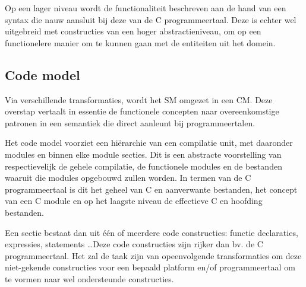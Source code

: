 Op een lager niveau wordt de functionaliteit beschreven aan de hand van een
syntax die nauw aansluit bij deze van de C programmeertaal. Deze is echter wel
uitgebreid met constructies van een hoger abstractieniveau, om op een
functionelere manier om te kunnen gaan met de entiteiten uit het domein.

\subsection{Code model}
\label{subsection:arch-code-model}

Via verschillende transformaties, wordt het SM omgezet in een CM. Deze overstap
vertaalt in essentie de functionele concepten naar overeenkomstige patronen in
een semantiek die direct aanleunt bij programmeertalen.

Het code model voorziet een hi\"erarchie van een compilatie unit, met daaronder
modules en binnen elke module secties. Dit is een abstracte voorstelling van
respectievelijk de gehele compilatie, de functionele modules en de bestanden
waaruit die modules opgebouwd zullen worden. In termen van de C programmeertaal
is dit het geheel van C en aanverwante bestanden, het concept van een C module
en op het laagste niveau de effectieve C en hoofding bestanden.

Een sectie bestaat dan uit \'e\'en of meerdere code constructies: functie
declaraties, expressies, statements \dots Deze code constructies zijn rijker
dan bv. de C programmeertaal. Het zal de taak zijn van opeenvolgende
transformaties om deze niet-gekende constructies voor een bepaald platform
en/of programmeertaal om te vormen naar wel ondersteunde constructies.

